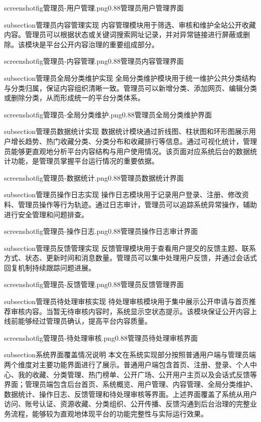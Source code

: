 screenshotfig{管理员-用户管理.png}{0.88}{管理员用户管理界面}

subsection{管理员内容管理实现}
内容管理模块用于筛选、审核和维护全站公开收藏内容。管理员可以根据状态或关键词搜索网址记录，并对异常链接进行屏蔽或删除。该模块是平台公开内容治理的重要组成部分。

screenshotfig{管理员-内容管理.png}{0.88}{管理员内容管理界面}

subsection{管理员全局分类维护实现}
全局分类维护模块用于统一维护公共分类结构与分类归属，保证内容组织清晰一致。管理员可以新增分类、添加网页、编辑分类或删除分类，从而形成统一的平台分类体系。

screenshotfig{管理员-全局分类维护.png}{0.88}{管理员全局分类维护界面}

subsection{管理员数据统计实现}
数据统计模块通过折线图、柱状图和环形图展示用户增长趋势、热门收藏分类、分类分布和收藏排行等信息。通过可视化统计，管理员能够更直观地分析平台内容结构与用户使用情况。该页面对应系统后台的数据统计功能，是管理员掌握平台运行情况的重要依据。

screenshotfig{管理员-数据统计.png}{0.88}{管理员数据统计界面}


subsection{管理员操作日志实现}
操作日志模块用于记录用户登录、注册、修改资料、管理员操作等行为轨迹。通过日志审计，管理员可以追踪系统异常操作，辅助进行安全管理和问题排查。

screenshotfig{管理员-操作日志.png}{0.88}{管理员操作日志审计界面}

subsection{管理员反馈管理实现}
反馈管理模块用于查看用户提交的反馈主题、联系方式、状态、更新时间和消息数量。管理员可以集中处理用户反馈，并通过会话式回复机制持续跟踪问题进展。

screenshotfig{管理员-反馈管理.png}{0.88}{管理员反馈管理界面}

subsection{管理员待处理审核实现}
待处理审核模块用于集中展示公开申请与首页推荐审核内容。当暂无待审核内容时，系统显示空状态提示。该模块保证公开内容上线前能够经过管理员确认，提高平台内容质量。

screenshotfig{管理员-待处理审核.png}{0.88}{管理员待处理审核界面}


subsection{系统界面覆盖情况说明}
本文在系统实现部分按照普通用户端与管理员端两个维度对主要功能界面进行了展示。普通用户端包含首页、注册、登录、个人中心、我的收藏、分类管理、热门榜单、公开广场、公开用户主页以及会话式反馈等界面；管理员端包含后台首页、系统概览、用户管理、内容管理、全局分类维护、数据统计、操作日志、反馈管理和待处理审核等界面。上述界面覆盖了系统从用户访问、账号认证、资源收藏、分类组织、公开传播、反馈沟通到后台治理的完整业务流程，能够较为直观地体现平台的功能完整性与实际运行效果。

